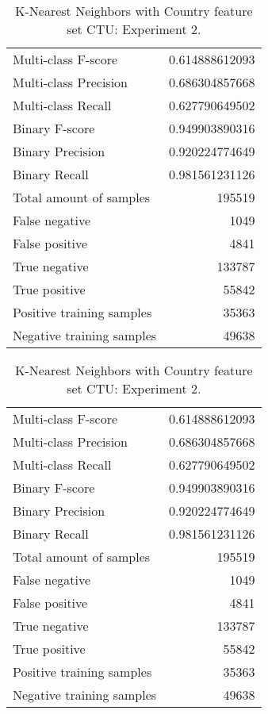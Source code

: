 \begin{table}[H]
\begin{minipage}{0.5\textwidth}
\caption{K-Nearest Neighbors with Country feature set CTU: Experiment 1.}
\centering
\begin{tabular}{l r}
\toprule
Multi-class F-score & 0.614888612093 \\
Multi-class Precision & 0.686304857668 \\
Multi-class Recall & 0.627790649502 \\
\midrule
Binary F-score & 0.949903890316 \\
Binary Precision & 0.920224774649 \\
Binary Recall & 0.981561231126 \\
\midrule
Total amount of samples & 195519 \\
False negative & 1049 \\
False positive & 4841 \\
True negative & 133787 \\
True positive & 55842 \\
\midrule
Positive training samples & 35363 \\
Negative training samples & 49638 \\
\bottomrule
\end{tabular}
\end{minipage}
\hfillx
\begin{minipage}{0.5\textwidth}
\caption{K-Nearest Neighbors with Country feature set CTU: Experiment 2.}
\centering
\begin{tabular}{l r}
\toprule
Multi-class F-score & 0.614888612093 \\
Multi-class Precision & 0.686304857668 \\
Multi-class Recall & 0.627790649502 \\
\midrule
Binary F-score & 0.949903890316 \\
Binary Precision & 0.920224774649 \\
Binary Recall & 0.981561231126 \\
\midrule
Total amount of samples & 195519 \\
False negative & 1049 \\
False positive & 4841 \\
True negative & 133787 \\
True positive & 55842 \\
\midrule
Positive training samples & 35363 \\
Negative training samples & 49638 \\
\bottomrule
\end{tabular}
\end{minipage}
\end{table}
